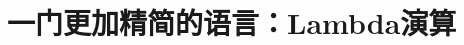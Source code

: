 \documentclass[../main.tex]{subfiles}
\begin{document}
  \section{一门更加精简的语言：Lambda演算}

  \begin{thebibliography}{0}
  \end{thebibliography}
\end{document}

